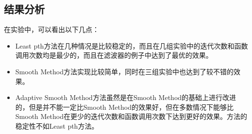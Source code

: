\documentclass{ctexart}
\begin{document}
\subsection{结果分析}
在实验中，可以看出以下几点：
\begin{itemize}
\item Least pth方法在几种情况是比较稳定的，而且在几组实验中的迭代次数和函数调用次数均是最少的，而且在滤波器的例子中达到了最优的效果。
\item Smooth Method方法实现比较简单，同时在三组实验中也达到了较不错的效果。
\item Adaptive Smooth Method方法虽然是在Smooth Method的基础上进行改进的，但是并不能一定比Smooth Method的效果好，但在多数情况下能够比Smooth Method在更少的迭代次数和函数调用次数下达到更好的效果。方法的稳定性不如Least pth方法。
\end{itemize}

\end{document}
